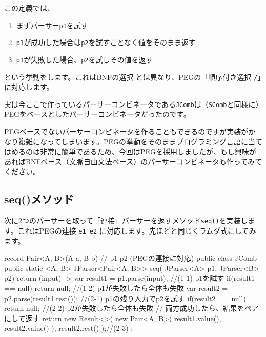 この定義では、

\begin{enumerate}
\item
  まずパーサー\texttt{p1}を試す
\item
  \texttt{p1}が成功した場合は\texttt{p2}を試すことなく値をそのまま返す
\item
  \texttt{p1}が失敗した場合、\texttt{p2}を試しその値を返す
\end{enumerate}

\noindent という挙動をします。これはBNFの選択 \texttt{\textbar{}}
とは異なり、PEGの「順序付き選択 \texttt{/}」に対応します。

実は今ここで作っているパーサーコンビネータである\texttt{JComb}は（\texttt{SComb}と同様に）PEGをベースとしたパーサーコンビネータだったのです。

PEGベースでないパーサーコンビネータを作ることもできるのですが実装がかなり複雑になってしまいます。PEGの挙動をそのままプログラミング言語に当てはめるのは非常に簡単であるため、今回はPEGを採用しましたが、もし興味があればBNFベース（文脈自由文法ベース）のパーサーコンビネータも作ってみてください。

\subsection{seq()メソッド}

次に2つのパーサーを取って「連接」パーサーを返すメソッド\texttt{seq()}を実装します。これはPEGの連接
\texttt{e1\ e2} に対応します。先ほどと同じくラムダ式にしてみます。

\begin{codescreen}{}
record Pair<A, B>(A a, B b){}
// p1 p2 (PEGの連接に対応)
public class JComb {
    public static <A, B> JParser<Pair<A, B>> seq(
        JParser<A> p1, JParser<B> p2) {
        return (input) -> {
            var result1 = p1.parse(input); //(1-1) p1を試す
            if(result1 == null) return null; 
                                           //(1-2) p1が失敗したら全体も失敗
            var result2 = p2.parse(result1.rest()); 
                                           //(2-1) p1の残り入力でp2を試す
            if(result2 == null) return null; 
                                           //(2-2) p2が失敗したら全体も失敗
            // 両方成功したら、結果をペアにして返す
            return new Result<>(
                new Pair<A, B>(
                    result1.value(), result2.value()
                ), result2.rest()
            );//(2-3)
        };
    }
}
\end{codescreen}

